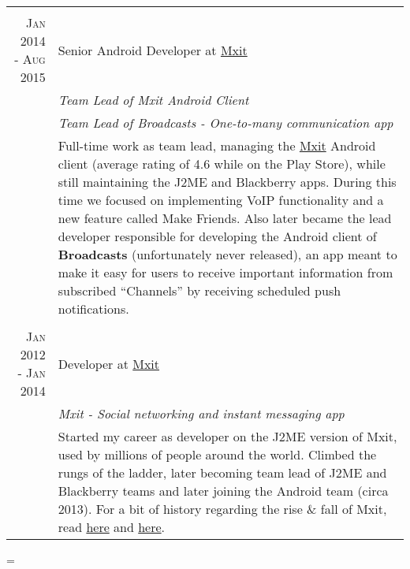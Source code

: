 \documentclass[a4paper,10pt,notitlepage]{article}
\newenvironment{absolutelynopagebreak}
  {\par\nobreak\vfil\penalty0\vfilneg
   \vtop\bgroup}
  {\par\xdef\tpd{\the\prevdepth}\egroup
   \prevdepth=\tpd}
\begin{document}
\begin{absolutelynopagebreak}
\begin{tabular}{r|p{11cm}}
 \multicolumn{2}{c}{} \\
 \textsc{Jan 2014 - Aug 2015} & Senior Android Developer at \href{www.mxit.com}{Mxit} \\
 &\emph{Team Lead of Mxit Android Client}\\
 &\emph{Team Lead of Broadcasts - One-to-many communication app}\\
 &\footnotesize{Full-time work as team lead, managing the \href{https://en.wikipedia.org/wiki/Mxit}{Mxit} Android client (average rating of 4.6 while on the Play Store), while still maintaining the J2ME and Blackberry apps. During this time we focused on implementing VoIP functionality and a new feature called Make Friends. Also later became the lead developer responsible for developing the Android client of \textbf{Broadcasts} (unfortunately never released), an app meant to make it easy for users to receive important information from subscribed ``Channels'' by receiving scheduled push notifications. }\\
 
 \multicolumn{2}{c}{} \\
\textsc{Jan 2012 - Jan 2014} & Developer at \href{www.mxit.com}{Mxit} \\
&\emph{Mxit - Social networking and instant messaging app} \\
&\footnotesize{Started my career as developer on the J2ME version of Mxit, used by millions of people around the world. Climbed the rungs of the ladder, later becoming team lead of J2ME and Blackberry teams and later joining the Android team (circa 2013). For a bit of history regarding the rise \& fall of Mxit, read \href{https://en.wikipedia.org/wiki/Mxit}{here} and \href{https://www.moneyweb.co.za/news/companies-and-deals/how-did-mxit-go-so-wrong/}{here}.}
\\

\end{tabular}

\end{absolutelynopagebreak}
\end{document}
